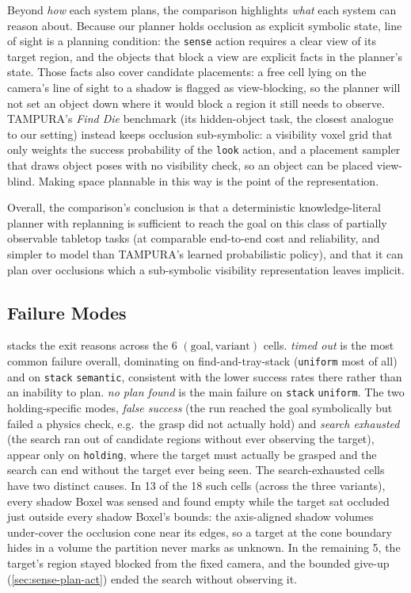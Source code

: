 Beyond \emph{how} each system plans, the comparison highlights \emph{what} each system can reason about. Because our planner holds occlusion as explicit symbolic state, line of sight is a planning condition: the \texttt{sense} action requires a clear view of its target region, and the objects that block a view are explicit facts in the planner's state. Those facts also cover candidate placements: a free cell lying on the camera's line of sight to a shadow is flagged as view-blocking, so the planner will not set an object down where it would block a region it still needs to observe. TAMPURA's \emph{Find Die} benchmark (its hidden-object task, the closest analogue to our setting) instead keeps occlusion sub-symbolic: a visibility voxel grid that only weights the success probability of the \texttt{look} action, and a placement sampler that draws object poses with no visibility check, so an object can be placed view-blind. Making space plannable in this way is the point of the representation.

Overall, the comparison's conclusion is that a deterministic knowledge-literal planner with replanning is sufficient to reach the goal on this class of partially observable tabletop tasks (at comparable end-to-end cost and reliability, and simpler to model than TAMPURA's learned probabilistic policy), and that it can plan over occlusions which a sub-symbolic visibility representation leaves implicit.

\subsection{Failure Modes}
\label{subsec:failure-modes}

 stacks the exit reasons across the 6 $(\text{goal}, \text{variant})$ cells. \emph{timed out} is the most common failure overall, dominating on find-and-tray-stack (\texttt{uniform} most of all) and on \texttt{stack} \texttt{semantic}, consistent with the lower success rates there rather than an inability to plan. \emph{no plan found} is the main failure on \texttt{stack} \texttt{uniform}. The two holding-specific modes, \emph{false success} (the run reached the goal symbolically but failed a physics check, e.g.\ the grasp did not actually hold) and \emph{search exhausted} (the search ran out of candidate regions without ever observing the target), appear only on \texttt{holding}, where the target must actually be grasped and the search can end without the target ever being seen. The search-exhausted cells have two distinct causes. In 13 of the 18 such cells (across the three variants), every shadow Boxel was sensed and found empty while the target sat occluded just outside every shadow Boxel's bounds: the axis-aligned shadow volumes under-cover the occlusion cone near its edges, so a target at the cone boundary hides in a volume the partition never marks as unknown. In the remaining 5, the target's region stayed blocked from the fixed camera, and the bounded give-up (\cref{sec:sense-plan-act}) ended the search without observing it.

